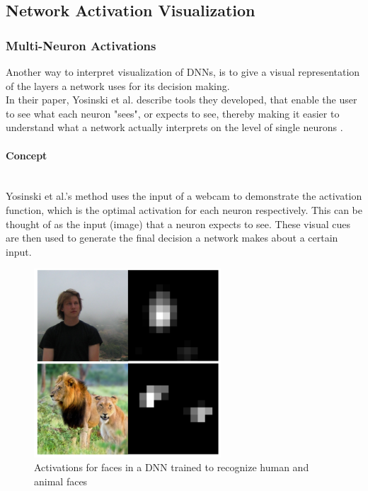 \documentclass{acmsiggraph}               %
\newcommand{\paragraphbr}[1]{\paragraph{#1}\mbox{}\\}
\begin{document}
\subsection{Network Activation Visualization}
\subsubsection{Multi-Neuron Activations}
Another way to interpret visualization of DNNs, is to give a visual representation of the layers a network uses for its decision making.\\ 
In their paper, Yosinski et al. describe tools they developed, that enable the user to see what each neuron "sees", or expects to see, thereby making it easier to understand what a network actually interprets on the level of single neurons \cite{Yosinski2015}.

\paragraphbr{Concept}

Yosinski et al.'s method uses the input of a webcam to demonstrate the activation function, which is the optimal activation for each neuron respectively. This can be thought of as the input (image) that a neuron expects to see. These visual cues are then used to generate the final decision a network makes about a certain input.

\begin{figure}[H]
\includegraphics[width=2.75in]{detection_yosinski_et_al}
\caption{Activations for faces in a DNN trained to recognize human and animal faces \protect\cite{Yosinski2015}}
\label{fig:face_detection}
\centering
\end{figure}
\end{document}
